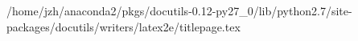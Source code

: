 /home/jzh/anaconda2/pkgs/docutils-0.12-py27_0/lib/python2.7/site-packages/docutils/writers/latex2e/titlepage.tex